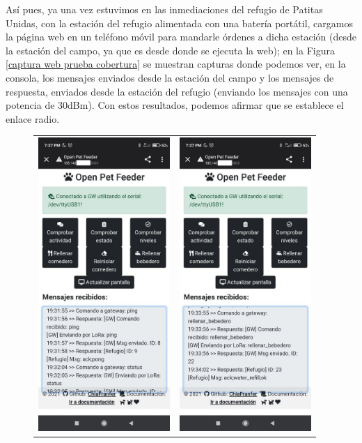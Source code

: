 \documentclass[12pt]{article}
\begin{document}
	\noindent Así pues, ya una vez estuvimos en las inmediaciones del refugio de Patitas Unidas, con la estación del refugio alimentada con una batería portátil, cargamos la página web en un teléfono móvil para mandarle órdenes a dicha estación (desde la estación del campo, ya que es desde donde se ejecuta la web); en la Figura \ref{captura web prueba cobertura} se muestran capturas donde podemos ver, en la consola, los mensajes enviados desde la estación del campo y los mensajes de respuesta, enviados desde la estación del refugio (enviando los mensajes con una potencia de 30dBm). Con estos resultados, podemos afirmar que se establece el enlace radio. \\
	\begin{figure}[h!]
		\begin{center}
			\begin{tabular}{cc}
				\includegraphics[width=50mm]{img/captura_web_cobertura_2.jpg} &   \includegraphics[width=50mm]{img/captura_web_cobertura_1.jpg} \\

\end{tabular}
\end{center}
\end{figure}
\end{document}

